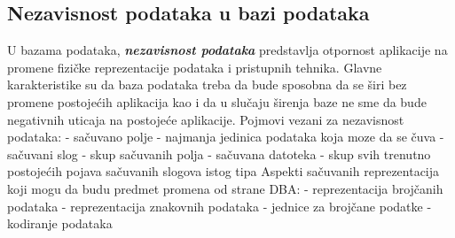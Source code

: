 \documentclass{article}
\begin{document}
\subsection{Nezavisnost podataka u bazi podataka}
U bazama podataka, \textbf{\textit{nezavisnost podataka}} predstavlja
otpornost aplikacije na promene fizičke reprezentacije podataka i 
pristupnih tehnika. Glavne karakteristike su da baza podataka treba da
bude sposobna da se širi bez promene postojećih aplikacija kao i da u
slučaju širenja baze ne sme da bude negativnih uticaja na postojeće
aplikacije. Pojmovi vezani za nezavisnost podataka:
\newline \hspace*{0.2cm}
- sačuvano polje - najmanja jedinica podataka koja moze da se čuva
\newline \hspace*{0.2cm}
- sačuvani slog - skup sačuvanih polja
\newline \hspace*{0.2cm}
- sačuvana datoteka - skup svih trenutno postojećih pojava sačuvanih 
slogova istog tipa
\newline
Aspekti sačuvanih reprezentacija koji mogu da budu predmet promena od
strane DBA:
\newline \hspace*{0.2cm}
- reprezentacija brojčanih podataka \hspace*{0.7cm}
- reprezentacija znakovnih podataka
\newline \hspace*{0.2cm}
- jednice za brojčane podatke \hspace*{1.65cm}
- kodiranje podataka
\end{document}
